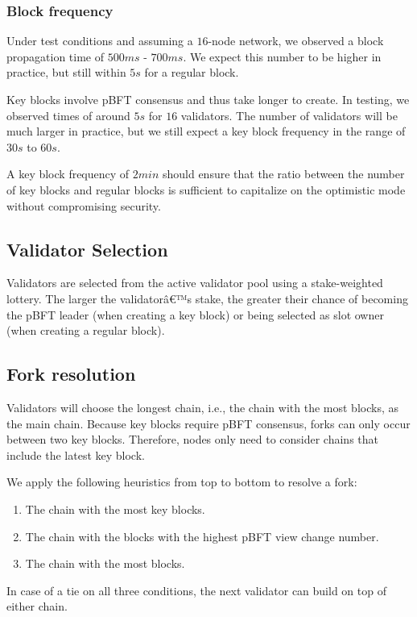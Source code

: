 \documentclass[8pt,fleqn,openany]{book}
\begin{document}
	\subsubsection{Block frequency}
	Under test conditions and assuming a $16$-node network, we observed a block propagation time of $500ms$ - $700ms$. We expect this number to be higher in practice, but still within $5s$ for a regular block. 
	
	Key blocks involve pBFT consensus and thus take longer to create. In testing, we observed times of around $5s$ for $16$ validators. The number of validators will be much larger in practice, but we still expect a key block frequency in the range of $30s$ to $60s$.
	
	A key block frequency of $2min$ should ensure that the ratio between the number of key blocks and regular blocks is sufficient to capitalize on the optimistic mode without compromising security.
	
	\subsection{Validator Selection}
	Validators are selected from the active validator pool using a stake-weighted lottery. The larger the validatorâ€™s stake, the greater their chance of becoming the pBFT leader (when creating a key block) or being selected as slot owner (when creating a regular block).
	
	\subsection{Fork resolution}
	Validators will choose the longest chain, i.e., the chain with the most blocks, as the main chain. Because key blocks require pBFT consensus, forks can only occur between two key blocks. Therefore, nodes only need to consider chains that include the latest key block.
	
	We apply the following heuristics from top to bottom to resolve a fork:
	
	\begin{enumerate}
		\item The chain with the most key blocks.
		\item The chain with the blocks with the highest pBFT view change number.
		\item The chain with the most blocks.
	\end{enumerate}
	
	In case of a tie on all three conditions, the next validator can build on top of either chain.
	
\end{document}
